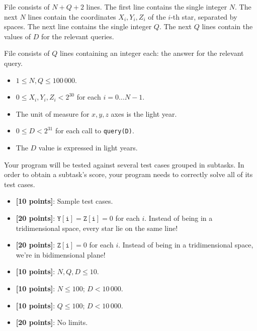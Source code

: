 \InputFile
File  consists of $N+Q+2$ lines. The first line contains the single integer $N$. The next $N$ lines contain the coordinates $X_i, Y_i, Z_i$ of the $i$-th star, separated by spaces. The next line contains the single integer $Q$. The next $Q$ lines contain the values of $D$ for the relevant queries.

\OutputFile
File \outputfile{} consists of $Q$ lines containing an integer each: the answer for the relevant query.

\Constraints
\begin{itemize}[nolistsep, itemsep=2mm]
  \item $1 \le N, Q \le 100\,000$.
  \item $0 \le X_i, Y_i, Z_i < 2^{30}$ for each $i=0\ldots N-1$.
  \item The unit of measure for $x, y, z$ axes is the light year.
  \item $0 \le D < 2^{31}$ for each call to \texttt{query(D)}.
  \item The $D$ value is expressed in light years.
\end{itemize}

\Scoring
Your program will be tested against several test cases grouped in subtasks.
In order to obtain a subtask's score, your program needs to correctly solve all of its test cases.

\pagebreak

\begin{itemize}[nolistsep,itemsep=2mm]
  \item \textbf{ [10 points]}: Sample test cases.
  \item \textbf{ [20 points]}: $\mathtt{Y[i]} = \mathtt{Z[i]} = 0$ for each $i$. Instead of being in a tridimensional space, every star lie on the same line!
  \item \textbf{ [20 points]}: $\mathtt{Z[i]} = 0$ for each $i$. Instead of being in a tridimensional space, we're in bidimensional plane!
  \item \textbf{ [10 points]}: $N, Q, D \le 10$.
  \item \textbf{ [10 points]}: $N \le 100$; $D < 10\,000$.
  \item \textbf{ [10 points]}: $Q \le 100$; $D < 10\,000$.
  \item \textbf{ [20 points]}: No limits.
\end{itemize}

